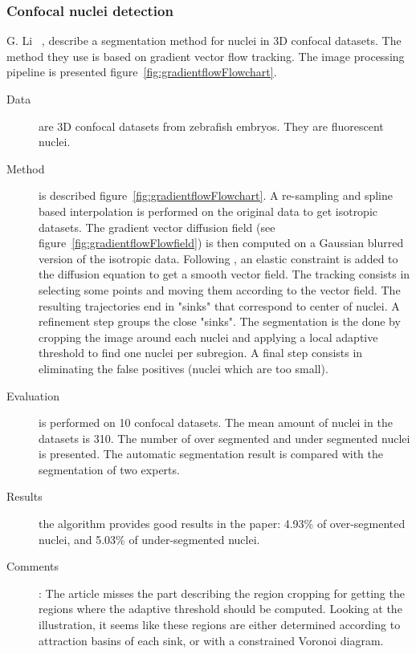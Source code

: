 \subsubsection*{Confocal nuclei detection}
G. Li {\etal}~\cite{li20073}, describe a segmentation method for nuclei in 3D confocal datasets. The method they use is based on gradient vector flow tracking.
The image processing pipeline is presented figure~\ref{fig:gradientflowFlowchart}.
\begin{description}
  \item[Data] are 3D confocal datasets from zebrafish embryos. They are fluorescent nuclei.
  \item[Method] is described figure~\ref{fig:gradientflowFlowchart}. 
  A re-sampling and spline based interpolation is performed on the original data to get isotropic datasets.
  The gradient vector diffusion field (see figure~\ref{fig:gradientflowFlowfield}) is then computed on a Gaussian blurred version of the isotropic data.
  Following \cite{bajcsy1989multiresolution}, an elastic constraint is added to the diffusion equation to get a smooth vector field.
  The tracking consists in selecting some points and moving them according to the vector field. The resulting trajectories end in "sinks" that correspond to center of nuclei.
  A refinement step groups the close "sinks".
  The segmentation is the done by cropping the image around each nuclei and applying a local adaptive threshold to find one nuclei per subregion.
  A final step consists in eliminating the false positives (nuclei which are too small).
  \item[Evaluation] is performed on 10 confocal datasets. The mean amount of nuclei in the datasets is 310. The number of over segmented and under segmented nuclei is presented. The automatic segmentation result is compared with the segmentation of two experts.
  \item[Results] the algorithm provides good results in the paper: 
  4.93\% of over-segmented nuclei,
  and 5.03\% of under-segmented nuclei.
  \item[Comments]:
  The article misses the part describing the region cropping for getting the regions where the adaptive
   threshold should be computed.
   Looking at the illustration, it seems like these regions are either determined
   according to attraction basins of each sink, or with a constrained Voronoi diagram.
\end{description}
